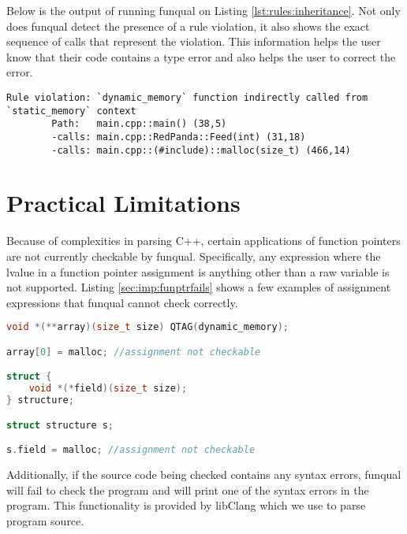 Below is the output of running funqual on Listing \ref{lst:rules:inheritance}.  Not only does funqual detect the presence of a rule violation, it also shows the exact sequence of calls that represent the violation.  This information helps the user know that their code contains a type error and also helps the user to correct the error.

\noindent\begin{minipage}[t]{\linewidth}
\begin{lstlisting}
Rule violation: `dynamic_memory` function indirectly called from `static_memory` context
        Path:   main.cpp::main() (38,5)
        -calls: main.cpp::RedPanda::Feed(int) (31,18)
        -calls: main.cpp::(#include)::malloc(size_t) (466,14)
\end{lstlisting}
\end{minipage}

\section{Practical Limitations}

Because of complexities in parsing C++, certain applications of function pointers are not currently checkable by funqual.  Specifically, any expression where the lvalue in a function pointer assignment is anything other than a raw variable is not supported.  Listing \ref{sec:imp:funptrfails} shows a few examples of assignment expressions that funqual cannot check correctly.

\noindent\begin{minipage}[t]{\linewidth}
\begin{lstlisting}[language=c++,label={sec:imp:funptrfails},caption={Examples of function pointer assignment expressions that are not checked correctly by funqual}]
void *(**array)(size_t size) QTAG(dynamic_memory);

array[0] = malloc; //assignment not checkable

struct {
    void *(*field)(size_t size);
} structure;

struct structure s;

s.field = malloc; //assignment not checkable
\end{lstlisting}
\end{minipage}

Additionally, if the source code being checked contains any syntax errors, funqual will fail to check the program and will print one of the syntax errors in the program.  This functionality is provided by libClang which we use to parse program source.  
